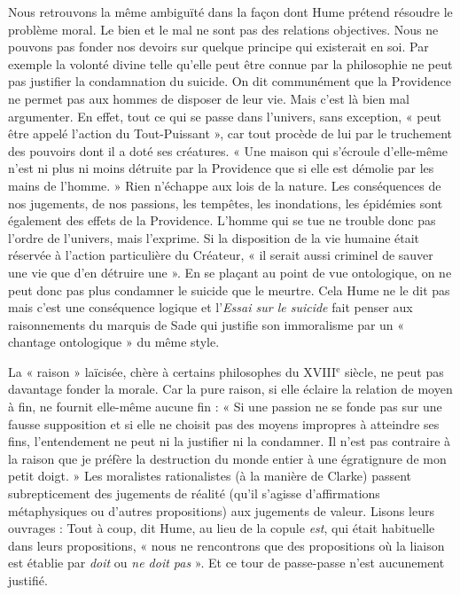 Nous retrouvons la même ambiguïté dans la façon dont
Hume prétend résoudre le problème moral. Le bien et le
mal ne sont pas des relations objectives. Nous ne pouvons
pas fonder nos devoirs sur quelque principe qui existerait
en soi. Par exemple la volonté divine telle qu’elle peut
être connue par la philosophie ne peut pas justifier la
condamnation du suicide. On dit communément que la
Providence ne permet pas aux hommes de disposer de
leur vie. Mais c’est là bien mal argumenter. En effet, tout
ce qui se passe dans l’univers, sans exception, « peut être
appelé l’action du Tout-Puissant », car tout procède de
lui par le truchement des pouvoirs dont il a doté ses créatures. 
« Une maison qui s'écroule d’elle-même n’est ni
plus ni moins détruite par la Providence que si elle est
démolie par les mains de l’homme. » Rien n’échappe aux
lois de la nature. Les conséquences de nos jugements,
de nos passions, les tempêtes, les inondations, les épidémies 
sont également des effets de la Providence. L’homme
qui se tue ne trouble donc pas l’ordre de l'univers, mais
l’exprime. Si la disposition de la vie humaine était réservée
à l’action particulière du Créateur,  « il serait aussi criminel
de sauver une vie que d’en détruire une ». En se plaçant
au point de vue ontologique, on ne peut donc pas plus
condamner le suicide que le meurtre. Cela Hume ne le
dit pas mais c’est une conséquence logique et l’{\it Essai
sur le suicide} fait penser aux raisonnements du marquis
de Sade qui justifie son immoralisme par un « chantage ontologique » du même style.

La « raison » laïcisée, chère à certains philosophes du
{\footnotesize XVIII}$^\text{e}$ siècle, ne peut pas davantage fonder la morale.
Car la pure raison, si elle éclaire la relation de moyen à
fin, ne fournit elle-même aucune fin : « Si une passion ne
se fonde pas sur une fausse supposition et si elle ne choisit
pas des moyens impropres à atteindre ses fins, l’entendement 
ne peut ni la justifier ni la condamner. Il n’est
pas contraire à la raison que je préfère la destruction du
monde entier à une égratignure de mon petit doigt. »
Les moralistes rationalistes (à la manière de Clarke)
passent subrepticement des jugements de réalité (qu’il
s’agisse d’affirmations métaphysiques ou d’autres propositions) 
aux jugements de valeur. Lisons leurs ouvrages :
Tout à coup, dit Hume, au lieu de la copule {\it est}, qui était
habituelle dans leurs propositions, « nous ne rencontrons
que des propositions où la liaison est établie par {\it doit} ou
{\it ne doit pas} ». Et ce tour de passe-passe n'est aucunement justifié.

